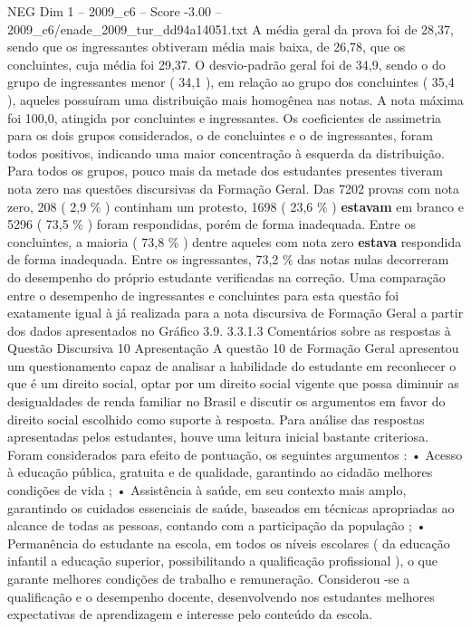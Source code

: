 \begin{textsample}{NEG Dim 1 – 2009\_c6 – Score -3.00 – 2009\_c6/enade\_2009\_tur\_dd94a14051.txt}
A média geral da prova foi de 28,37, sendo que os ingressantes obtiveram média mais baixa, de 26,78, que os concluintes, cuja média foi 29,37.
O desvio-padrão geral foi de 34,9, sendo o do grupo de ingressantes menor ( 34,1 ), em relação ao grupo dos concluintes ( 35,4 ), aqueles possuíram uma distribuição mais homogênea nas notas.
A nota máxima foi 100,0, atingida por concluintes e ingressantes.
Os coeficientes de assimetria para os dois grupos considerados, o de concluintes e o de ingressantes, foram todos positivos, indicando uma maior concentração à esquerda da distribuição.
Para todos os grupos, pouco mais da metade dos estudantes presentes tiveram nota zero nas questões discursivas da Formação Geral.
Das 7202 provas com nota zero, 208 ( 2,9 \% ) continham um protesto, 1698 ( 23,6 \% ) \textbf{estavam} em branco e 5296 ( 73,5 \% ) foram respondidas, porém de forma inadequada.
Entre os concluintes, a maioria ( 73,8 \% ) dentre aqueles com nota zero \textbf{estava} respondida de forma inadequada.
Entre os ingressantes, 73,2 \% das notas nulas decorreram do desempenho do próprio estudante verificadas na correção.
Uma comparação entre o desempenho de ingressantes e concluintes para esta questão foi exatamente igual à já realizada para a nota discursiva de Formação Geral a partir dos dados apresentados no Gráfico 3.9. 3.3.1.3 Comentários sobre as respostas à Questão Discursiva 10 Apresentação A questão 10 de Formação Geral apresentou um questionamento capaz de analisar a habilidade do estudante em reconhecer o que é um direito social, optar por um direito social vigente que possa diminuir as desigualdades de renda familiar no Brasil e discutir os argumentos em favor do direito social escolhido como suporte à resposta.
Para análise das respostas apresentadas pelos estudantes, houve uma leitura inicial bastante criteriosa.
Foram considerados para efeito de pontuação, os seguintes argumentos : • Acesso à educação pública, gratuita e de qualidade, garantindo ao cidadão melhores condições de vida ; • Assistência à saúde, em seu contexto mais amplo, garantindo os cuidados essenciais de saúde, baseados em técnicas apropriadas ao alcance de todas as pessoas, contando com a participação da população ; • Permanência do estudante na escola, em todos os níveis escolares ( da educação infantil a educação superior, possibilitando a qualificação profissional ), o que garante melhores condições de trabalho e remuneração.
Considerou -se a qualificação e o desempenho docente, desenvolvendo nos estudantes melhores expectativas de aprendizagem e interesse pelo conteúdo da escola.

\end{textsample}

